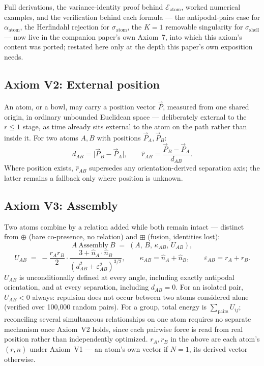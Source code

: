 \documentclass[12pt, a4paper]{article}
\begin{document}
Full derivations, the variance-identity proof behind
$\mathcal{E}_{\text{atom}}$, worked numerical examples, and the
verification behind each formula --- the antipodal-pairs case for
$\alpha_{\text{atom}}$, the Herfindahl rejection for
$\sigma_{\text{atom}}$, the $K=1$ removable singularity for
$\sigma_{\text{shell}}$ --- now live in the companion paper's own
Axiom~7, into which this axiom's content was ported; restated here
only at the depth this paper's own exposition needs.

\subsection{Axiom V2: External position}
\label{axiom:v2}
An atom, or a bowl, may carry a position vector $\vec P$, measured
from one shared origin, in ordinary unbounded Euclidean space ---
deliberately external to the $r\le 1$ stage, as time already sits
external to the atom on the path rather than inside it. For two
atoms $A,B$ with positions $\vec P_A,\vec P_B$:
\[
d_{AB} = \lvert \vec P_B - \vec P_A\rvert, \qquad
\hat r_{AB} = \frac{\vec P_B-\vec P_A}{d_{AB}}.
\]
Where position exists, $\hat r_{AB}$ supersedes any
orientation-derived separation axis; the latter remains a fallback
only where position is unknown.

\subsection{Axiom V3: Assembly}
\label{axiom:v3}
Two atoms combine by a relation added while both remain intact ---
distinct from $\oplus$ (bare co-presence, no relation) and $\boxplus$
(fusion, identities lost):
\[
A\ \mathrm{Assembly}\ B \;=\; (A,\,B,\,\kappa_{AB},\,U_{AB}),
\]
\[
U_{AB} \;=\; -\frac{r_A r_B}{2}\cdot
\frac{3+\hat n_A\cdot\hat n_B}{(d_{AB}^2+\varepsilon_{AB}^2)^{3/2}},
\qquad
\kappa_{AB} = \hat n_A+\hat n_B,
\qquad
\varepsilon_{AB} = r_A+r_B.
\]
$U_{AB}$ is unconditionally defined at every angle, including exactly
antipodal orientation, and at every separation, including $d_{AB}=0$.
For an isolated pair, $U_{AB}<0$ always: repulsion does not occur
between two atoms considered alone (verified over 100{,}000 random
pairs). For a group, total energy is $\sum_{\text{pairs}}U_{ij}$;
reconciling several simultaneous relationships on one atom requires
no separate mechanism once Axiom~V2 holds, since each pairwise force
is read from real position rather than independently optimized.
$r_A,r_B$ in the above are each atom's $(r,\hat n)$ under
Axiom~V1 --- an atom's own vector if $N=1$, its derived vector
otherwise.
\end{document}
